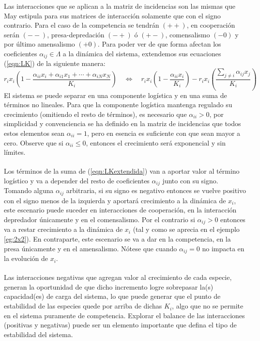 Las interacciones que se aplican a la matriz de incidencias son las mismas que May estipula para sus matrices de interacción solamente que con el signo contrario. Para el caso de la competencia se tendrán $(++)$, en cooperación serán $(--)$, presa-depredación $(-+)$ ó $(+-)$, comensalismo $(-0)$ y por último amensalismo $(+0)$. Para poder ver de que forma afectan los coeficientes $\alpha_{ij}\in\Lambda$  a la dinámica del sistema, extendemos sus ecuaciones (\ref{eqn:LK}) de la siguiente manera:
\begin{equation}\label{eqn:LKextendida}
	r_ix_i\left (1 - \frac{\alpha_{ii}x_i+\alpha_{i1}x_1+\cdots+\alpha_{iN}x_N}{K_i}\right )\quad\Longleftrightarrow\quad r_ix_i\left (1-\frac{\alpha_{ii}x_i}{K_i}\right )-r_ix_i\left (\frac{\sum_{j\neq i}\alpha_{ij}x_j}{K_i}\right )
\end{equation}
El sistema se puede separar en una componente logística y en una suma de términos no lineales. Para que la componente logística mantenga regulado su crecimiento (omitiendo el resto de términos), es necesario que $\alpha_{ii}>0$, por simplicidad y convenciencia se ha definido en la matriz de incidencias que todos estos elementos sean $\alpha_{ii}=1$, pero en esencia es suficiente con que sean mayor a cero. Observe que si $\alpha_{ii}\leq 0$, entonces el crecimiento será exponencial y sin límites.
\\
\\
Los términos de la suma de (\ref{eqn:LKextendida}) van a aportar valor al término logístico y va a depender del resto de coeficientes $\alpha_{ij}$ junto con su signo. Tomando alguna $\alpha_{ij}$ arbitraria, si su signo es negativo entonces se vuelve positivo con el signo menos de la izquierda y aportará crecimiento a la dinámica de $x_i$, este escenario puede suceder en interacciones de cooperación, en la interacción depredador únicamente y en el comensalismo. Por el contrario si $\alpha_{ij}>0$ entonces va a restar crecimiento a la dinámica de $x_i$ (tal y como se aprecia en el ejemplo \ref{eg:2x2}). En contraparte, este escenario se va a dar en la competencia, en la presa únicamente y en el amensalismo. Nótese que cuando $\alpha_{ij}=0$ no impacta en la evolución de $x_i$. \\
\\
Las interacciones negativas que agregan valor al crecimiento de cada especie, generan la oportunidad de que dicho incremento logre sobrepasar la(s) capacidad(es) de carga del sistema, lo que puede generar que el punto de estabilidad de las especies quede por arriba de dichas $K_i$, algo que no se permite en el sistema puramente de competencia. Explorar el balance de las interacciones (positivas y negativas) puede ser un elemento importante que defina el tipo de estabilidad del sistema.\\

